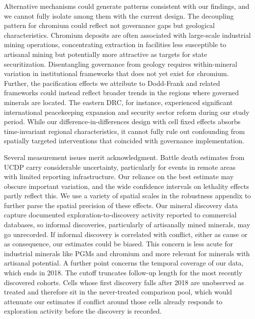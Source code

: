 \documentclass[11pt]{article}
\begin{document}
Alternative mechanisms could generate patterns consistent with our findings, and we cannot fully isolate among them with the current design. The decoupling pattern for chromium could reflect not governance gaps but geological characteristics. Chromium deposits are often associated with large-scale industrial mining operations, concentrating extraction in facilities less susceptible to artisanal mining but potentially more attractive as targets for state securitization. Disentangling governance from geology requires within-mineral variation in institutional frameworks that does not yet exist for chromium. Further, the pacification effects we attribute to Dodd-Frank and related frameworks could instead reflect broader trends in the regions where governed minerals are located. The eastern DRC, for instance, experienced significant international peacekeeping expansion and security sector reform during our study period. While our difference-in-differences design with cell fixed effects absorbs time-invariant regional characteristics, it cannot fully rule out confounding from spatially targeted interventions that coincided with governance implementation.

Several measurement issues merit acknowledgment. Battle death estimates from UCDP carry considerable uncertainty, particularly for events in remote areas with limited reporting infrastructure. Our reliance on the best estimate may obscure important variation, and the wide confidence intervals on lethality effects partly reflect this. We use a variety of spatial scales in the robustness appendix to further parse the spatial precision of these effects. Our mineral discovery data capture documented exploration-to-discovery activity reported to commercial databases, so informal discoveries, particularly of artisanally mined minerals, may go unrecorded. If informal discovery is correlated with conflict, either as cause or as consequence, our estimates could be biased. This concern is less acute for industrial minerals like PGMs and chromium and more relevant for minerals with artisanal potential. A further point concerns the temporal coverage of our data, which ends in 2018. The cutoff truncates follow-up length for the most recently discovered cohorts. Cells whose first discovery falls after 2018 are unobserved as treated and therefore sit in the never-treated comparison pool, which would attenuate our estimates if conflict around those cells already responds to exploration activity before the discovery is recorded.
\end{document}
